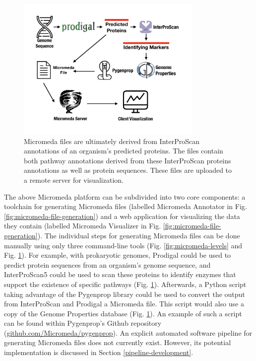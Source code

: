 \begin{figure}[!ht]
  \centering
	\includegraphics[width=0.8\textwidth]{media/how-micromeda-files-are-built.pdf}
	 \caption{Micromeda files are ultimately derived from InterProScan annotations of an organism's predicted proteins. The files contain both pathway annotations derived from these InterProScan proteins annotations as well as protein sequences. These files are uploaded to a remote server for visualization.}
	 \label{fig:micromeda-file-building-and-use}
\end{figure}

The above Micromeda platform can be subdivided into two core components: a toolchain for generating Micromeda files (labelled Micromeda Annotator in Fig. \ref{fig:micromeda-file-generation}) and a web application for visualizing the data they contain (labelled Micromeda Visualizer in Fig. \ref{fig:micromeda-file-generation}). The individual steps for generating Micromeda files can be done manually using only three command-line tools (Fig. \ref{fig:micromeda-levels} and Fig. \ref{fig:micromeda-file-building-and-use}). For example, with prokaryotic genomes, Prodigal could be used to predict protein sequences from an organism's genome sequence, and InterProScan5 could be used to scan these proteins to identify enzymes that support the existence of specific pathways (Fig. \ref{fig:micromeda-file-building-and-use}). Afterwards, a Python script taking advantage of the Pygenprop library could be used to convert the output from InterProScan and Prodigal a Micromeda file. This script would also use a copy of the Genome Properties database (Fig. \ref{fig:micromeda-file-building-and-use}). An example of such a script can be found within Pygenprop's Github repository (\href{github.com/Micromeda/pygenprop}{github.com/Micromeda/pygenprop}). An explicit automated software pipeline for generating Micromeda files does not currently exist. However, its potential implementation is discussed in Section \ref{pipeline-development}.

